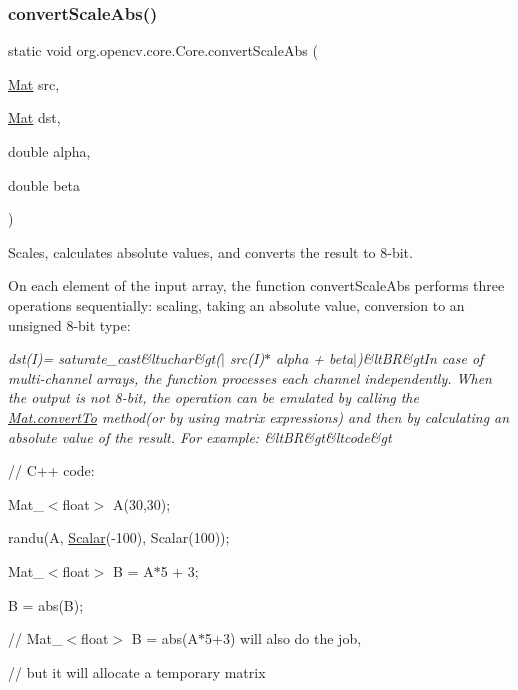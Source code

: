 \subsubsection{\texorpdfstring{convert\+Scale\+Abs()}{convertScaleAbs()}\hspace{0.1cm}{\footnotesize\ttfamily [1/2]}}
{\footnotesize\ttfamily static void org.\+opencv.\+core.\+Core.\+convert\+Scale\+Abs (\begin{DoxyParamCaption}\item[{\mbox{\hyperlink{classorg_1_1opencv_1_1core_1_1_mat}{Mat}}}]{src,  }\item[{\mbox{\hyperlink{classorg_1_1opencv_1_1core_1_1_mat}{Mat}}}]{dst,  }\item[{double}]{alpha,  }\item[{double}]{beta }\end{DoxyParamCaption})\hspace{0.3cm}{\ttfamily [static]}}

Scales, calculates absolute values, and converts the result to 8-\/bit.

On each element of the input array, the function {\ttfamily convert\+Scale\+Abs} performs three operations sequentially\+: scaling, taking an absolute value, conversion to an unsigned 8-\/bit type\+:

{\itshape dst(\+I)= saturate\+\_\+cast\&ltuchar\&gt($\vert$ src(\+I)$\ast$ alpha + beta$\vert$)\&lt\+BR\&gt\+In case of multi-\/channel arrays, the function processes each channel independently. When the output is not 8-\/bit, the operation can be emulated by calling the {\ttfamily \mbox{\hyperlink{classorg_1_1opencv_1_1core_1_1_mat_aa783d679e1b68aa5f9da6434be761eb7}{Mat.\+convert\+To}}} method(or by using matrix expressions) and then by calculating an absolute value of the result. For example\+: \&lt\+BR\&gt\&ltcode\&gt}

// C++ code\+:

Mat\+\_\+$<$float$>$ A(30,30);

randu(A, \mbox{\hyperlink{classorg_1_1opencv_1_1core_1_1_scalar}{Scalar}}(-\/100), Scalar(100));

Mat\+\_\+$<$float$>$ B = A$\ast$5 + 3;

B = abs(\+B);

// Mat\+\_\+$<$float$>$ B = abs(A$\ast$5+3) will also do the job,

// but it will allocate a temporary matrix


